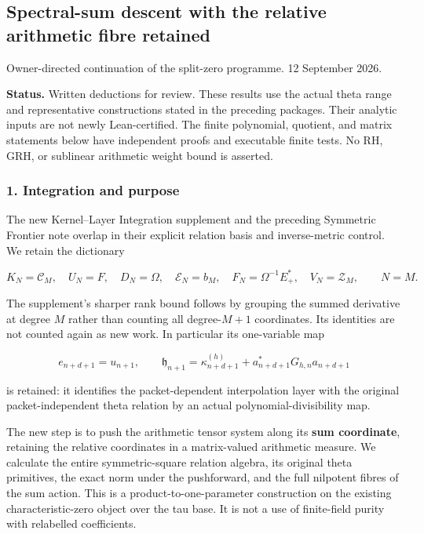 


\subsection{Spectral-sum descent with the relative arithmetic fibre
retained}\label{spectral_sum_full:spectral-sum-descent-with-the-relative-arithmetic-fibre-retained}

Owner-directed continuation of the split-zero programme. 12 September
2026.

\textbf{Status.} Written deductions for review. These results use the
actual theta range and representative constructions stated in the
preceding packages. Their analytic inputs are not newly Lean-certified.
The finite polynomial, quotient, and matrix statements below have
independent proofs and executable finite tests. No RH, GRH, or sublinear
arithmetic weight bound is asserted.

\subsubsection{1. Integration and purpose}\label{spectral_sum_full:integration-and-purpose}

The new Kernel--Layer Integration supplement and the preceding Symmetric
Frontier note overlap in their explicit relation basis and
inverse-metric control. We retain the dictionary

\[K_N=\mathcal C_M,\quad U_N=F,\quad D_N=\Omega,\quad
\mathscr E_N=b_M,\quad F_N=\Omega^{-1}E_+^*,\quad V_N=\mathcal Z_M,\qquad N=M.\tag{1.1}\]

The supplement's sharper rank bound follows by grouping the summed
derivative at degree \(M\) rather than counting all degree-\(M+1\)
coordinates. Its identities are not counted again as new work. In
particular its one-variable map

\[e_{n+d+1}=u_{n+1},\qquad
\mathfrak h_{n+1}=\kappa_{n+d+1}^{(h)}+a_{n+d+1}^*G_{h,n}a_{n+d+1}\tag{1.2}\]

is retained: it identifies the packet-dependent interpolation layer with
the original packet-independent theta relation by an actual
polynomial-divisibility map.

The new step is to push the arithmetic tensor system along its
\textbf{sum coordinate}, retaining the relative coordinates in a
matrix-valued arithmetic measure. We calculate the entire
symmetric-square relation algebra, its original theta primitives, the
exact norm under the pushforward, and the full nilpotent fibres of the
sum action. This is a product-to-one-parameter construction on the
existing characteristic-zero object over the tau base. It is not a use
of finite-field purity with relabelled coefficients.

